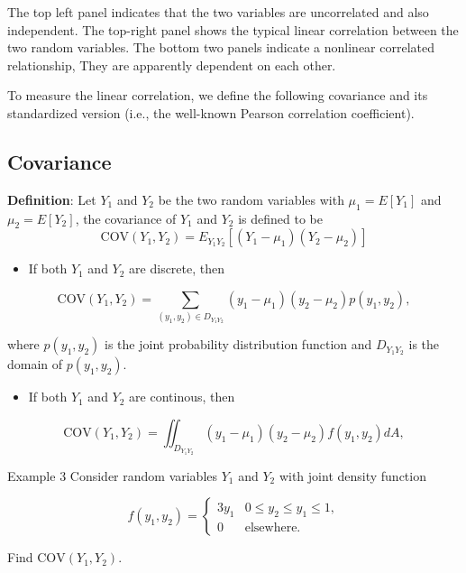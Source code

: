 \documentclass[
]{book}
\providecommand{\tightlist}{%
  \setlength{\itemsep}{0pt}\setlength{\parskip}{0pt}}
\begin{document}
The top left panel indicates that the two variables are uncorrelated and also independent. The top-right panel shows the typical linear correlation between the two random variables. The bottom two panels indicate a nonlinear correlated relationship, They are apparently dependent on each other.

To measure the linear correlation, we define the following covariance and its standardized version (i.e., the well-known Pearson correlation coefficient).

\hfill\break

\hypertarget{covariance}{%
\subsection{Covariance}\label{covariance}}

\textbf{Definition}: Let \(Y_1\) and \(Y_2\) be the two random variables with \(\mu_1 = E[Y_1]\) and \(\mu_2 = E[Y_2]\), the covariance of \(Y_1\) and \(Y_2\) is defined to be
\[
\text{COV}(Y_1,Y_2) = E_{Y_1Y_2}\left[(Y_1-\mu_1)(Y_2-\mu_2) \right]
\]

\begin{itemize}
\tightlist
\item
  If both \(Y_1\) and \(Y_2\) are discrete, then
\end{itemize}

\[
\text{COV}(Y_1,Y_2) = \sum_{(y_1,y_2) \in D_{Y_1Y_2}} (y_1-\mu_1)(y_2-\mu_2)p(y_1,y_2),
\]

where \(p(y_1,y_2)\) is the joint probability distribution function and \(D_{Y_1Y_2}\) is the domain of \(p(y_1,y_2)\).

\begin{itemize}
\tightlist
\item
  If both \(Y_1\) and \(Y_2\) are continous, then
\end{itemize}

\[
\text{COV}(Y_1,Y_2) = \iint_{ D_{Y_1Y_2}} (y_1-\mu_1)(y_2-\mu_2)f(y_1,y_2)dA,
\]

\hfill\break

Example 3 Consider random variables \(Y_1\) and \(Y_2\) with joint density function

\[
\displaystyle f(y_1,y_2) = \begin{cases} 
 3y_1 & \text{$0 \le y_2 \le y_1 \le 1$}, \\  
 0 & \text{elsewhere}.
 \end{cases}
\]

Find \(\text{COV}(Y_1, Y_2)\).
\end{document}
